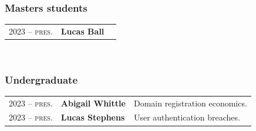 \documentclass[10pt,singlecolumn]{article} %
\begin{document}
\subsubsection*{Masters students}
\begin{tabular}{rll}
2023 -- \textsc{pres.} & \textbf{Lucas Ball} & \\ 
\end{tabular}\\

\subsubsection*{Undergraduate}
\begin{tabular}{rll}
2023 -- \textsc{pres.} & \textbf{Abigail Whittle} & Domain registration economics.\\ 
2023 -- \textsc{pres.} & \textbf{Lucas Stephens} & User authentication breaches.\\ 


\end{tabular}
\end{document}
